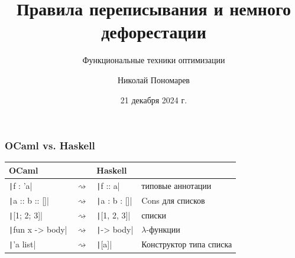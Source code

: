 \documentclass[
    aspectratio=169,
]{beamer}
\title[Правила переписывания и дефорестация]{Правила переписывания и немного дефорестации}
\subtitle{Функциональные техники оптимизации}
\author{Николай Пономарев}
\institute[Матмех СПбГУ]{Математико-механический факультет СПбГУ}
\date{21 декабря 2024 г.}
\begin{document}
\begin{frame}
    \maketitle
\end{frame}

\begin{frame}
    \frametitle{OCaml vs. Haskell}

    \begin{center}
        \begin{tabular}{lcll}
            \toprule
            OCaml                             &                    & Haskell                          &                         \\
            \midrule
            \texttt|f : 'a|        & $\rightsquigarrow$ & \texttt|f :: a|     & типовые аннотации       \\
            \texttt|a :: b :: []|  & $\rightsquigarrow$ & \texttt|a : b : []| & Cons для списков        \\
            \texttt|[1; 2; 3]|     & $\rightsquigarrow$ & \texttt|[1, 2, 3]|  & списки                  \\
            \texttt|fun x -> body| & $\rightsquigarrow$ & \texttt|\x -> body| & $\lambda$-функции       \\
            \texttt|'a list|       & $\rightsquigarrow$ & \texttt|[a]|        & Конструктор типа списка \\
            \bottomrule
        \end{tabular}
    \end{center}

\end{frame}
\end{document}

